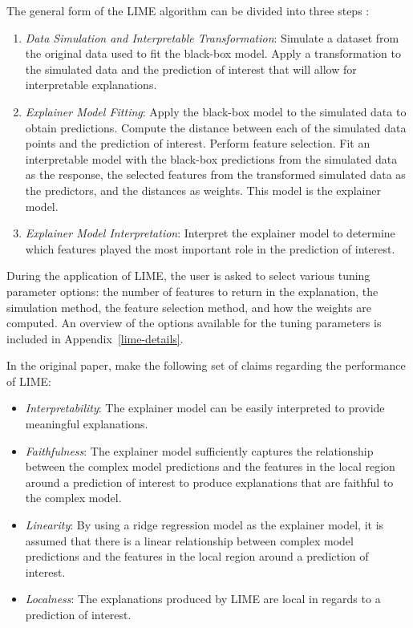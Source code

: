 \documentclass[AMS,STIX2COL]{WileyNJD-v2}\usepackage[]{graphicx}\usepackage[]{color}
\begin{document}
The general form of the LIME algorithm can be divided into three steps \citep[see also][]{laugel:2018}:

\begin{enumerate}

\item \emph{Data Simulation and Interpretable Transformation}: Simulate a dataset from the original data used to fit the black-box model. Apply a transformation to the simulated data and the prediction of interest that will allow for interpretable explanations.

\item \emph{Explainer Model Fitting}: Apply the black-box model to the simulated data to obtain predictions. Compute the distance between each of the simulated data points and the prediction of interest. Perform feature selection. Fit an interpretable model with the black-box predictions from the simulated data as the response, the selected features from the transformed simulated data as the predictors, and the distances as weights. This model is the explainer model.

\item \emph{Explainer Model Interpretation}: Interpret the explainer model to determine which features played the most important role in the prediction of interest.

\end{enumerate}

During the application of LIME, the user is asked to select various tuning parameter options: the number of features to return in the explanation, the simulation method, the feature selection method, and how the weights are computed. An overview of the options available for the tuning parameters is included in Appendix~\ref{lime-details}.

In the original paper, \citet{ribeiro:2016} make the following set of claims regarding the performance of LIME:

\begin{itemize}
\item \emph{Interpretability}: The explainer model can be easily interpreted to provide meaningful explanations.
\item \emph{Faithfulness}: The explainer model sufficiently captures the relationship between the complex model predictions and the features in the local region around a prediction of interest to produce explanations that are faithful to the complex model.
\item \emph{Linearity}: By using a ridge regression model as the explainer model, it is assumed that there is a linear relationship between complex model predictions and the features in the local region around a prediction of interest.
\item \emph{Localness}: The explanations produced by LIME are local in regards to a prediction of interest.
\end{itemize}
\end{document}
